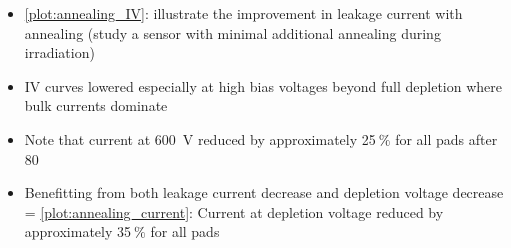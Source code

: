 \begin{itemize}
	\item \ref{plot:annealing_IV}: illustrate the improvement in leakage current with annealing (study a sensor with minimal additional annealing during irradiation)
	\item IV curves lowered especially at high bias voltages beyond full depletion where bulk currents dominate
	\item Note that current at \SI{600}{\volt} reduced by approximately 25$~\%$ for all pads after \SI{80}{\min}
	\item Benefitting from both leakage current decrease and depletion voltage decrease = \ref{plot:annealing_current}: Current at depletion voltage reduced by approximately 35$~\%$ for all pads
\end{itemize}





